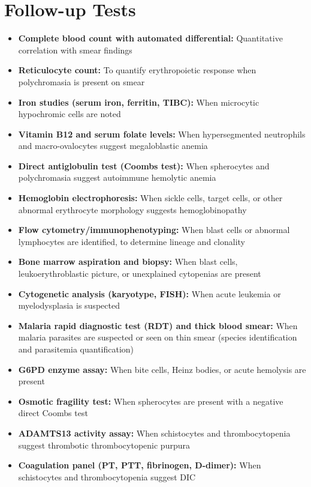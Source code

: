 \section*{Follow-up Tests}
\begin{itemize}
  \item \textbf{Complete blood count with automated differential:} Quantitative correlation with smear findings
  \item \textbf{Reticulocyte count:} To quantify erythropoietic response when polychromasia is present on smear
  \item \textbf{Iron studies (serum iron, ferritin, TIBC):} When microcytic hypochromic cells are noted
  \item \textbf{Vitamin B12 and serum folate levels:} When hypersegmented neutrophils and macro-ovalocytes suggest megaloblastic anemia
  \item \textbf{Direct antiglobulin test (Coombs test):} When spherocytes and polychromasia suggest autoimmune hemolytic anemia
  \item \textbf{Hemoglobin electrophoresis:} When sickle cells, target cells, or other abnormal erythrocyte morphology suggests hemoglobinopathy
  \item \textbf{Flow cytometry/immunophenotyping:} When blast cells or abnormal lymphocytes are identified, to determine lineage and clonality
  \item \textbf{Bone marrow aspiration and biopsy:} When blast cells, leukoerythroblastic picture, or unexplained cytopenias are present
  \item \textbf{Cytogenetic analysis (karyotype, FISH):} When acute leukemia or myelodysplasia is suspected
  \item \textbf{Malaria rapid diagnostic test (RDT) and thick blood smear:} When malaria parasites are suspected or seen on thin smear (species identification and parasitemia quantification)
  \item \textbf{G6PD enzyme assay:} When bite cells, Heinz bodies, or acute hemolysis are present
  \item \textbf{Osmotic fragility test:} When spherocytes are present with a negative direct Coombs test
  \item \textbf{ADAMTS13 activity assay:} When schistocytes and thrombocytopenia suggest thrombotic thrombocytopenic purpura
  \item \textbf{Coagulation panel (PT, PTT, fibrinogen, D-dimer):} When schistocytes and thrombocytopenia suggest DIC
\end{itemize}


